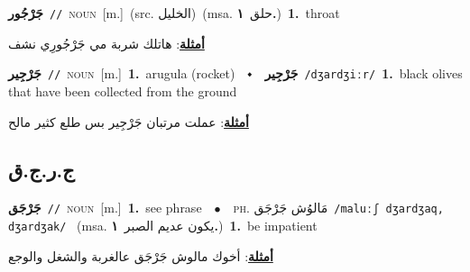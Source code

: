 \documentclass[10pt,a4paper,twoside]{article} %
\begin{document}
\begin{multicols}{2}
{\setlength\topsep{0pt}\textbf{\foreignlanguage{arabic}{جَرْجُور}}\ {\color{gray}\texttt{//}\color{black}}\ \textsc{noun}\ [m.]\ (src. \color{gray}\foreignlanguage{arabic}{الخليل}\color{black})\ \color{gray}(msa. \foreignlanguage{arabic}{حلق}~\foreignlanguage{arabic}{\textbf{١.}})\color{black}\ \textbf{1.}~throat\  \begin{flushright}\color{gray}\foreignlanguage{arabic}{\textbf{\underline{\foreignlanguage{arabic}{أمثلة}}}: هاتلك شربة مي جَرْجُورِي نشف}\end{flushright}\color{black}} \vspace{2mm}

{\setlength\topsep{0pt}\textbf{\foreignlanguage{arabic}{جَرْجِير}}\ {\color{gray}\texttt{//}\color{black}}\ \textsc{noun}\ [m.]\ \textbf{1.}~arugula (rocket)\ \ $\smblkdiamond$\ \ \setlength\topsep{0pt}\textbf{\foreignlanguage{arabic}{جَرْجِير}}\ {\color{gray}\texttt{/dʒardʒiːr/}\color{black}}\ \textbf{1.}~black olives that have been collected from the ground\  \begin{flushright}\color{gray}\foreignlanguage{arabic}{\textbf{\underline{\foreignlanguage{arabic}{أمثلة}}}: عملت مرتبان جَرْجِير بس طلع كثير مالح}\end{flushright}\color{black}} \vspace{2mm}

\vspace{-3mm}
\subsection*{\color{blue}\foreignlanguage{arabic}{ج.ر.ج.ق}\color{blue}{}} 

{\setlength\topsep{0pt}\textbf{\foreignlanguage{arabic}{جَرْجَق}}\ {\color{gray}\texttt{//}\color{black}}\ \textsc{noun}\ [m.]\ \textbf{1.}~see phrase\ \ $\bullet$\ \ \textsc{ph.} \color{gray} \foreignlanguage{arabic}{مَالوُش جَرْجَق}\color{black}\ {\color{gray}\texttt{/{\sffamily maluːʃ dʒardʒaq, dʒardʒak}/}\color{black}}\ \color{gray} (msa. \foreignlanguage{arabic}{يكون عديم الصبر}~\foreignlanguage{arabic}{\textbf{١.}})\color{black}\ \textbf{1.}~be impatient\  \begin{flushright}\color{gray}\foreignlanguage{arabic}{\textbf{\underline{\foreignlanguage{arabic}{أمثلة}}}: أخوك مالوش جَرْجَق عالغربة والشغل والوجع}\end{flushright}\color{black}} \vspace{2mm}


\end{multicols}
\end{document}
